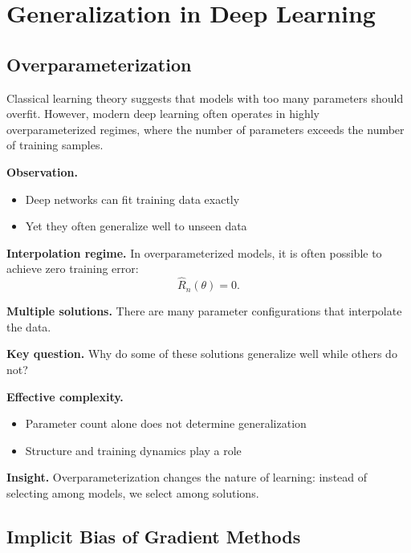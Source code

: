 \chapter{Generalization in Deep Learning}

\section{Overparameterization}

Classical learning theory suggests that models with too many parameters should overfit. However, modern deep learning often operates in highly overparameterized regimes, where the number of parameters exceeds the number of training samples.

\medskip

\noindent
\textbf{Observation.}
\begin{itemize}
    \item Deep networks can fit training data exactly
    \item Yet they often generalize well to unseen data
\end{itemize}

\medskip

\noindent
\textbf{Interpolation regime.}  
In overparameterized models, it is often possible to achieve zero training error:
\[
\hat{R}_n(\theta) = 0.
\]

\medskip

\noindent
\textbf{Multiple solutions.}  
There are many parameter configurations that interpolate the data.

\medskip

\noindent
\textbf{Key question.}  
Why do some of these solutions generalize well while others do not?

\medskip

\noindent
\textbf{Effective complexity.}
\begin{itemize}
    \item Parameter count alone does not determine generalization
    \item Structure and training dynamics play a role
\end{itemize}

\medskip

\noindent
\textbf{Insight.}  
Overparameterization changes the nature of learning: instead of selecting among models, we select among solutions.

\section{Implicit Bias of Gradient Methods}

